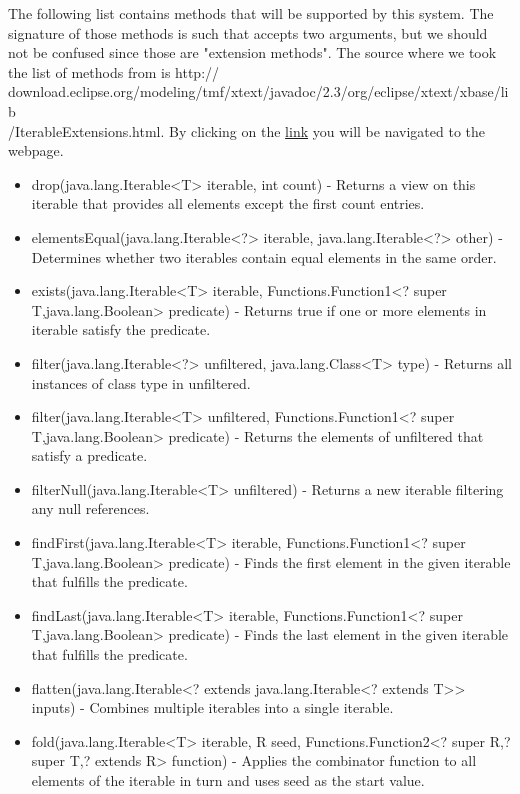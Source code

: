 The following list contains methods that will be supported by this system. The signature of those methods is such that accepts two arguments, but we should not be confused since those are "extension methods". The source where we took the list of methods from is http://\\download.eclipse.org/modeling/tmf/xtext/javadoc/2.3/org/eclipse/xtext/xbase/lib\\/IterableExtensions.html. By clicking on the \href{http://download.eclipse.org/modeling/tmf/xtext/javadoc/2.3/org/eclipse/xtext/xbase/lib/IterableExtensions.html}{link} you will be navigated to the webpage.
\begin{itemize}
	\item drop(java.lang.Iterable<T> iterable, int count) - Returns a view on this iterable that provides all elements except the first count entries.
	\item elementsEqual(java.lang.Iterable<?> iterable, java.lang.Iterable<?> other) - Determines whether two iterables contain equal elements in the same order.
	\item exists(java.lang.Iterable<T> iterable, Functions.Function1<? super T,java.lang.Boolean> predicate) - Returns true if one or more elements in iterable satisfy the predicate.
	\item filter(java.lang.Iterable<?> unfiltered, java.lang.Class<T> type) - Returns all instances of class type in unfiltered.
	\item filter(java.lang.Iterable<T> unfiltered, Functions.Function1<? super T,java.lang.Boolean> predicate) - Returns the elements of unfiltered that satisfy a predicate.
	\item filterNull(java.lang.Iterable<T> unfiltered) - Returns a new iterable filtering any null references.
	\item findFirst(java.lang.Iterable<T> iterable, Functions.Function1<? super T,java.lang.Boolean> predicate) - Finds the first element in the given iterable that fulfills the predicate.
	\item findLast(java.lang.Iterable<T> iterable, Functions.Function1<? super T,java.lang.Boolean> predicate) - Finds the last element in the given iterable that fulfills the predicate.
	\item flatten(java.lang.Iterable<? extends java.lang.Iterable<? extends T>> inputs) - Combines multiple iterables into a single iterable.
	\item fold(java.lang.Iterable<T> iterable, R seed, Functions.Function2<? super R,? super T,? extends R> function) - Applies the combinator function to all elements of the iterable in turn and uses seed as the start value.

\end{itemize}
